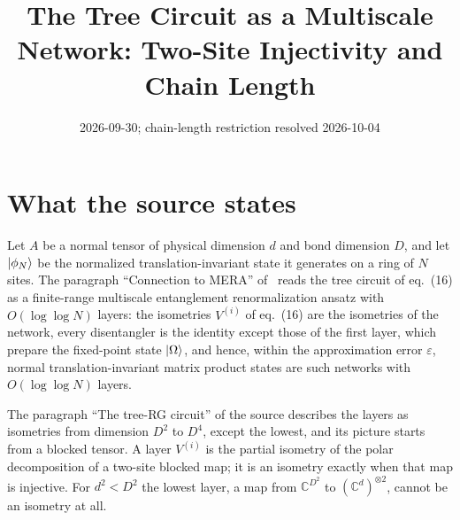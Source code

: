 \documentclass{article}
\title{The Tree Circuit as a Multiscale Network: Two-Site Injectivity and Chain Length}
\author{}
\date{2026-09-30; chain-length restriction resolved 2026-10-04}
\begin{document}
\maketitle
{}

\section{What the source states}
Let $A$ be a normal tensor of physical dimension $d$ and bond dimension $D$, and
let $|\phi_N\rangle$ be the normalized translation-invariant state it generates on
a ring of $N$ sites. The paragraph ``Connection to MERA''
of~\cite{Malz2024Preparation} reads the tree circuit of eq.~(16) as a
finite-range multiscale entanglement renormalization ansatz with
$O(\log\log N)$ layers: the isometries $V^{(i)}$ of eq.~(16) are the isometries
of the network, every disentangler is the identity except those of the first
layer, which prepare the fixed-point state $|\Omega\rangle$, and hence, within the
approximation error $\varepsilon$, normal translation-invariant matrix product
states are such networks with $O(\log\log N)$ layers.

The paragraph ``The tree-RG circuit'' of the source describes the layers as
isometries from dimension $D^2$ to $D^4$, except the lowest, and its picture
starts from a blocked tensor. A layer $V^{(i)}$ is the partial isometry of the
polar decomposition of a two-site blocked map; it is an isometry exactly when
that map is injective. For $d^2<D^2$ the lowest layer, a map from $\mathbb{C}^{D^2}$ to
$(\mathbb{C}^d)^{\otimes2}$, cannot be an isometry at all.
\end{document}
